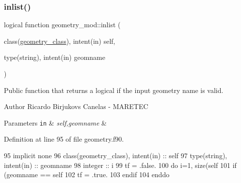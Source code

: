 \subsubsection{\texorpdfstring{inlist()}{inlist()}}
{\footnotesize\ttfamily logical function geometry\+\_\+mod\+::inlist (\begin{DoxyParamCaption}\item[{class(\mbox{\hyperlink{structgeometry__mod_1_1geometry__class}{geometry\+\_\+class}}), intent(in)}]{self,  }\item[{type(string), intent(in)}]{geomname }\end{DoxyParamCaption})\hspace{0.3cm}{\ttfamily [private]}}



Public function that returns a logical if the input geometry name is valid. 

\begin{DoxyAuthor}{Author}
Ricardo Birjukovs Canelas -\/ M\+A\+R\+E\+T\+EC 
\end{DoxyAuthor}

\begin{DoxyParams}[1]{Parameters}
\mbox{\tt in}  & {\em self,geomname} & \\
\hline
\end{DoxyParams}


Definition at line 95 of file geometry.\+f90.


\begin{DoxyCode}
95     \textcolor{keywordtype}{implicit none}
96     \textcolor{keywordtype}{class}(geometry\_class), \textcolor{keywordtype}{intent(in)} :: self
97     \textcolor{keywordtype}{type}(string), \textcolor{keywordtype}{intent(in)} :: geomname
98     \textcolor{keywordtype}{integer} :: i
99     tf = .false.
100     \textcolor{keywordflow}{do} i=1, \textcolor{keyword}{size}(self%
101         \textcolor{keywordflow}{if} (geomname == self%
102             tf = .true.
103 \textcolor{keywordflow}{        endif}
104 \textcolor{keywordflow}{    enddo}
\end{DoxyCode}
\mbox{\label{namespacegeometry__mod_abcb09c0f5274c27cb79b0dd009ed94b3}} 
